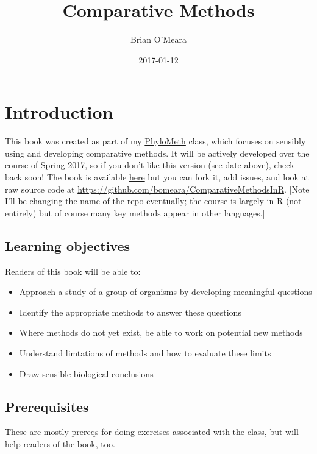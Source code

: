 \documentclass[]{book}
\title{Comparative Methods}
\author{Brian O'Meara}
\date{2017-01-12}
\providecommand{\tightlist}{%
  \setlength{\itemsep}{0pt}\setlength{\parskip}{0pt}}
\theoremstyle{definition}
\theoremstyle{definition}
\theoremstyle{remark}
\begin{document}
\maketitle

{
\setcounter{tocdepth}{1}
\tableofcontents
}
\chapter{Introduction}\label{introduction}

This book was created as part of my
\href{http://www.phylometh.org}{PhyloMeth} class, which focuses on
sensibly using and developing comparative methods. It will be actively
developed over the course of Spring 2017, so if you don't like this
version (see date above), check back soon! The book is available
\href{https://bookdown.org/bomeara/comparative-methods/}{here} but you
can fork it, add issues, and look at raw source code at
\url{https://github.com/bomeara/ComparativeMethodsInR}. {[}Note I'll be
changing the name of the repo eventually; the course is largely in R
(not entirely) but of course many key methods appear in other
languages.{]}

\section{Learning objectives}\label{learning-objectives}

Readers of this book will be able to:

\begin{itemize}
\tightlist
\item
  Approach a study of a group of organisms by developing meaningful
  questions
\item
  Identify the appropriate methods to answer these questions
\item
  Where methods do not yet exist, be able to work on potential new
  methods
\item
  Understand limtations of methods and how to evaluate these limits
\item
  Draw sensible biological conclusions
\end{itemize}

\section{Prerequisites}\label{prerequisites}

These are mostly prereqs for doing exercises associated with the class,
but will help readers of the book, too.
\end{document}
